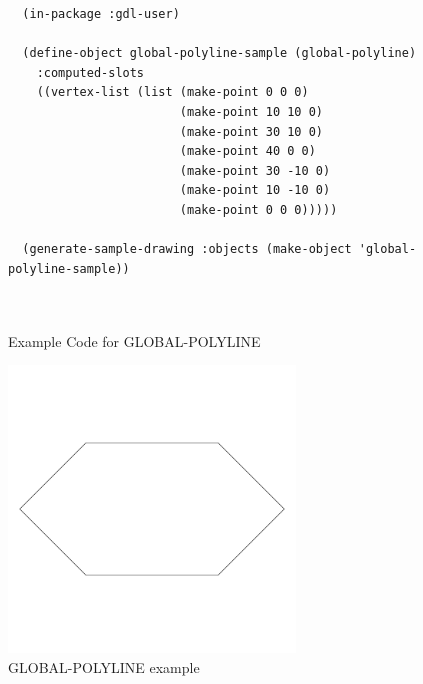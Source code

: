 \documentclass [11pt]{book}
\begin{document}
\begin{itemize}
\begin{description}
\end{description}




\begin{figure}
\begin{lrbox}{\boxedverb}
\begin{minipage}{\linewidth}
{\small

\begin{verbatim}
  (in-package :gdl-user)

  (define-object global-polyline-sample (global-polyline)
    :computed-slots
    ((vertex-list (list (make-point 0 0 0)
                        (make-point 10 10 0)
                        (make-point 30 10 0)
                        (make-point 40 0 0)
                        (make-point 30 -10 0)
                        (make-point 10 -10 0)
                        (make-point 0 0 0)))))
  
  (generate-sample-drawing :objects (make-object 'global-polyline-sample))

  
\end{verbatim}}
\end{minipage}
\end{lrbox}
\fbox{\usebox{\boxedverb}}

\caption{Example Code for GLOBAL-POLYLINE}

\label{fig:example-code-GLOBAL-POLYLINE}

\end{figure}

\begin{figure}
\begin{center}
\includegraphics[width=3in,height=3in]{../images/example-GLOBAL-POLYLINE.pdf}
\end{center}

\caption{GLOBAL-POLYLINE example}


\end{figure}
\end{itemize}
\end{document}
